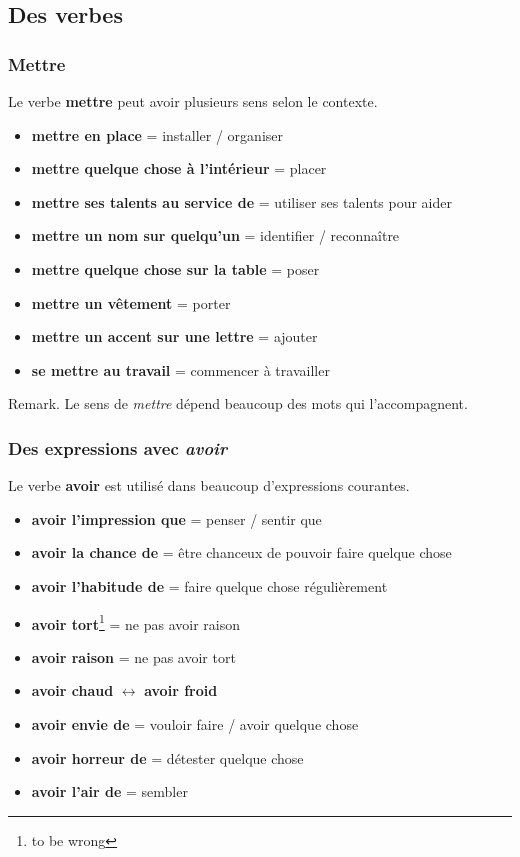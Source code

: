 \documentclass[math,code]{amznotes}
\theoremstyle{remark}
\begin{document}
\subsection*{Des verbes}

\subsubsection*{Mettre}

Le verbe \textbf{mettre} peut avoir plusieurs sens selon le contexte.

\begin{itemize}
    \item \textbf{mettre en place} = installer / organiser
    \item \textbf{mettre quelque chose à l'intérieur} = placer
    \item \textbf{mettre ses talents au service de} = utiliser ses talents pour aider
    \item \textbf{mettre un nom sur quelqu'un} = identifier / reconnaître
    \item \textbf{mettre quelque chose sur la table} = poser
    \item \textbf{mettre un vêtement} = porter
    \item \textbf{mettre un accent sur une lettre} = ajouter
    \item \textbf{se mettre au travail} = commencer à travailler
\end{itemize}

\begin{notebox}
    Remark. Le sens de \textit{mettre} dépend beaucoup des mots qui l'accompagnent.
\end{notebox}

\subsubsection*{Des expressions avec \textit{avoir}}

Le verbe \textbf{avoir} est utilisé dans beaucoup d'expressions courantes.

\begin{itemize}
    \item \textbf{avoir l'impression que} = penser / sentir que
    \item \textbf{avoir la chance de} = être chanceux de pouvoir faire quelque chose
    \item \textbf{avoir l'habitude de} = faire quelque chose régulièrement
    \item \textbf{avoir tort}\footnote{to be wrong} = ne pas avoir raison
    \item \textbf{avoir raison} = ne pas avoir tort
    \item \textbf{avoir chaud} $\leftrightarrow$ \textbf{avoir froid}
    \item \textbf{avoir envie de} = vouloir faire / avoir quelque chose
    \item \textbf{avoir horreur de} = détester quelque chose
    \item \textbf{avoir l'air de} = sembler
\end{itemize}
\end{document}
